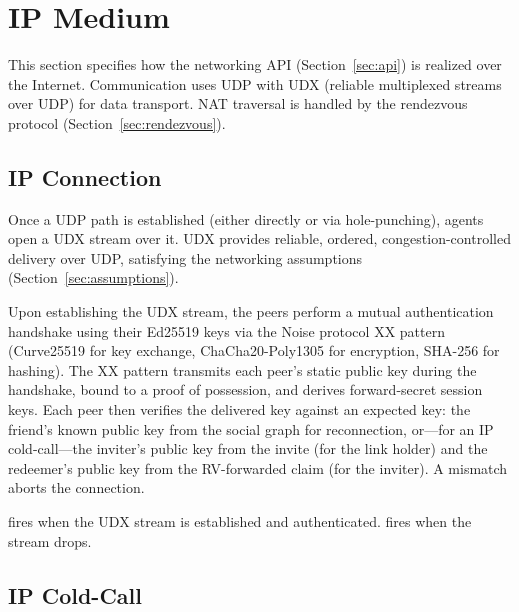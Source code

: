 \section{IP Medium}
\label{sec:ip}
This section specifies how the networking API (Section~\ref{sec:api}) is realized over the Internet.  Communication uses UDP with UDX (reliable multiplexed streams over UDP) for data transport.  NAT traversal is handled by the rendezvous protocol (Section~\ref{sec:rendezvous}).

\subsection{IP Connection}
\label{sec:ip-connection}
Once a UDP path is established (either directly or via hole-punching), agents open a UDX stream over it. UDX provides reliable, ordered, congestion-controlled delivery over UDP, satisfying the networking assumptions (Section~\ref{sec:assumptions}).

Upon establishing the UDX stream, the peers perform a mutual authentication handshake using their Ed25519 keys via the Noise protocol XX pattern (Curve25519 for key exchange, ChaCha20-Poly1305 for encryption, SHA-256 for hashing).  The XX pattern transmits each peer's static public key during the handshake, bound to a proof of possession, and derives forward-secret session keys.  Each peer then verifies the delivered key against an expected key: the friend's known public key from the social graph for reconnection, or---for an IP cold-call---the inviter's public key from the invite (for the link holder) and the redeemer's public key from the RV-forwarded claim (for the inviter).  A mismatch aborts the connection.

 fires when the UDX stream is established and authenticated.  fires when the stream drops.

\subsection{IP Cold-Call}
\label{sec:ip-cold-call}

